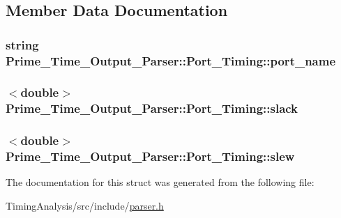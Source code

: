 \subsection{Member Data Documentation}
\hypertarget{structPrime__Time__Output__Parser_1_1Port__Timing_a4c7ae6cb0e76db94fe3b03822ead72c4}{
\subsubsection[{port\-\_\-name}]{\setlength{\rightskip}{0pt plus 5cm}string Prime\-\_\-\-Time\-\_\-\-Output\-\_\-\-Parser\-::\-Port\-\_\-\-Timing\-::port\-\_\-name}}\label{structPrime__Time__Output__Parser_1_1Port__Timing_a4c7ae6cb0e76db94fe3b03822ead72c4}
\hypertarget{structPrime__Time__Output__Parser_1_1Port__Timing_a21231dfc490477789c81e0c9e3e8c18d}{
\subsubsection[{slack}]{$<$double$>$ Prime\-\_\-\-Time\-\_\-\-Output\-\_\-\-Parser\-::\-Port\-\_\-\-Timing\-::slack}}\label{structPrime__Time__Output__Parser_1_1Port__Timing_a21231dfc490477789c81e0c9e3e8c18d}
\hypertarget{structPrime__Time__Output__Parser_1_1Port__Timing_a33e7eb34b63367e3b639999e1cb793bf}{
\subsubsection[{slew}]{$<$double$>$ Prime\-\_\-\-Time\-\_\-\-Output\-\_\-\-Parser\-::\-Port\-\_\-\-Timing\-::slew}}\label{structPrime__Time__Output__Parser_1_1Port__Timing_a33e7eb34b63367e3b639999e1cb793bf}


The documentation for this struct was generated from the following file\-:\begin{DoxyCompactItemize}
\item 
Timing\-Analysis/src/include/\hyperlink{parser_8h}{parser.\-h}\end{DoxyCompactItemize}
